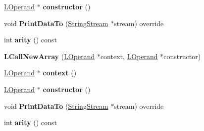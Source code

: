 \begin{DoxyCompactItemize}
\item 
\hyperlink{classv8_1_1internal_1_1_l_operand}{L\+Operand} $\ast$ {\bfseries constructor} ()\hypertarget{classv8_1_1internal_1_1_l_call_new_array_aeda3b4ff8fafcf3f7b24bd8e3f64bbea}{}\label{classv8_1_1internal_1_1_l_call_new_array_aeda3b4ff8fafcf3f7b24bd8e3f64bbea}

\item 
void {\bfseries Print\+Data\+To} (\hyperlink{classv8_1_1internal_1_1_string_stream}{String\+Stream} $\ast$stream) override\hypertarget{classv8_1_1internal_1_1_l_call_new_array_add922262b764ca49467bb7797c8ee6ee}{}\label{classv8_1_1internal_1_1_l_call_new_array_add922262b764ca49467bb7797c8ee6ee}

\item 
int {\bfseries arity} () const \hypertarget{classv8_1_1internal_1_1_l_call_new_array_a82f7b48744a6d59495dd9bd36f91d611}{}\label{classv8_1_1internal_1_1_l_call_new_array_a82f7b48744a6d59495dd9bd36f91d611}

\item 
{\bfseries L\+Call\+New\+Array} (\hyperlink{classv8_1_1internal_1_1_l_operand}{L\+Operand} $\ast$context, \hyperlink{classv8_1_1internal_1_1_l_operand}{L\+Operand} $\ast$constructor)\hypertarget{classv8_1_1internal_1_1_l_call_new_array_a4bd46fe318f41b8ad3d446686db3e0de}{}\label{classv8_1_1internal_1_1_l_call_new_array_a4bd46fe318f41b8ad3d446686db3e0de}

\item 
\hyperlink{classv8_1_1internal_1_1_l_operand}{L\+Operand} $\ast$ {\bfseries context} ()\hypertarget{classv8_1_1internal_1_1_l_call_new_array_a7f1e1801fd731a8fbecc43a2cbf2140c}{}\label{classv8_1_1internal_1_1_l_call_new_array_a7f1e1801fd731a8fbecc43a2cbf2140c}

\item 
\hyperlink{classv8_1_1internal_1_1_l_operand}{L\+Operand} $\ast$ {\bfseries constructor} ()\hypertarget{classv8_1_1internal_1_1_l_call_new_array_aeda3b4ff8fafcf3f7b24bd8e3f64bbea}{}\label{classv8_1_1internal_1_1_l_call_new_array_aeda3b4ff8fafcf3f7b24bd8e3f64bbea}

\item 
void {\bfseries Print\+Data\+To} (\hyperlink{classv8_1_1internal_1_1_string_stream}{String\+Stream} $\ast$stream) override\hypertarget{classv8_1_1internal_1_1_l_call_new_array_add922262b764ca49467bb7797c8ee6ee}{}\label{classv8_1_1internal_1_1_l_call_new_array_add922262b764ca49467bb7797c8ee6ee}

\item 
int {\bfseries arity} () const \hypertarget{classv8_1_1internal_1_1_l_call_new_array_a82f7b48744a6d59495dd9bd36f91d611}{}\label{classv8_1_1internal_1_1_l_call_new_array_a82f7b48744a6d59495dd9bd36f91d611}


\end{DoxyCompactItemize}
